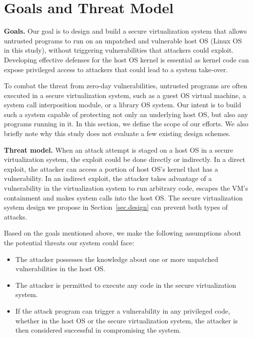 \section{Goals and Threat Model}
\label{sec.motivation-and-background}

\textbf{Goals.}
Our goal is to design and build a secure virtualization system that allows
untrusted programs to run on an unpatched and vulnerable host OS (Linux OS in
this study), without triggering vulnerabilities that attackers could exploit.
Developing effective defenses for the host OS kernel is essential as kernel code
can expose privileged access to attackers that could lead to a system take-over.

To combat the threat from zero-day vulnerabilities, untrusted programs are often executed in a 
secure virtualization system, such as a guest OS virtual machine, a system call 
interposition module, or a library OS system. Our intent is to
build such a system capable of protecting not only
an underlying host OS, but also any programs running in it. 
In this section, we define the scope of our efforts. We also briefly note why 
this study does not evaluate a few existing design schemes.

\noindent
\textbf{Threat model.}
When an attack attempt is staged
on a host OS in a secure virtualization system,
the exploit could be done directly or indirectly.
In a direct exploit, the attacker can access a portion of host OS's kernel
that has a vulnerability. In an indirect exploit,
the attacker takes advantage of a vulnerability in the virtualization system to 
run arbitrary code, escapes the VM's containment and  
makes system calls into the host OS. 
The secure virtualization system design we propose
in Section~\ref{sec.design} can prevent both types of attacks.


Based on the goals mentioned above, we make the following assumptions about the
potential threats our system could face:

\begin{itemize}\setlength\itemsep{0em}

\item The attacker possesses the knowledge about one or more unpatched 
vulnerabilities in the host OS.

\item The attacker is permitted to execute any code in the secure 
virtualization system.

\item If the attack program can trigger a vulnerability in any privileged 
code, whether in the host OS or the secure virtualization system, the attacker 
is then considered successful in compromising the system.

\end{itemize}

